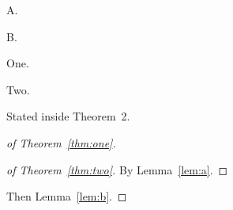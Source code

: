 \documentclass{llncs}
\begin{document}
\begin{lemma}\label{lem:a}A.\end{lemma}
\begin{lemma}\label{lem:b}B.\end{lemma}
\begin{theorem}\label{thm:one}One.\end{theorem}
\begin{theorem}\label{thm:two}Two.
  \begin{lemma}\label{lem:inner}Stated inside Theorem~2.\end{lemma}
\end{theorem}

\begin{proof}[of Theorem~\ref{thm:one}]
  \begin{proof}[of Theorem~\ref{thm:two}]
    By Lemma~\ref{lem:a}.
  \end{proof}
  Then Lemma~\ref{lem:b}.
\end{proof}
\end{document}
